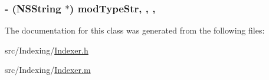 \hypertarget{interface_indexer_a00bdac9f17c1a48234d3c42b544b1a12}{
\subsubsection[{mod\-Type\-Str}]{\setlength{\rightskip}{0pt plus 5cm}-\/ (N\-S\-String $\ast$) mod\-Type\-Str\hspace{0.3cm}{\ttfamily [read]}, {\ttfamily [write]}, {\ttfamily [atomic]}, {\ttfamily [retain]}}}\label{interface_indexer_a00bdac9f17c1a48234d3c42b544b1a12}


The documentation for this class was generated from the following files\-:\begin{DoxyCompactItemize}
\item 
src/\-Indexing/\hyperlink{_indexer_8h}{Indexer.\-h}\item 
src/\-Indexing/\hyperlink{_indexer_8m}{Indexer.\-m}\end{DoxyCompactItemize}
